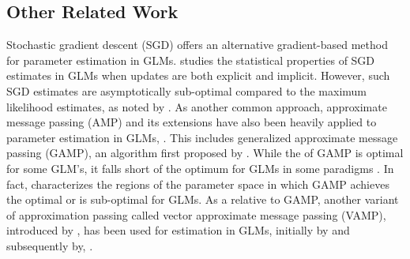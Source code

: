 \subsection{Other Related Work}
Stochastic gradient descent (SGD) \citep{robbins1951stochastic,sakrison1965efficient} offers an alternative gradient-based method for parameter estimation in GLMs.
\cite{toulis2014statistical} studies the statistical properties of SGD estimates in GLMs when updates are both explicit and implicit.
However, such SGD estimates are asymptotically sub-optimal compared to the maximum likelihood estimates, as noted by \cite{toulis2014statistical}.
As another common approach, approximate message passing (AMP) and its extensions have also been heavily applied to parameter estimation in GLMs, \eg \cite{mondelli2021approximate,venkataramanan2022estimation,zhang2024spectral,barbier2019optimal,zhu2018amp,schniter2016vector,zhao2024vector}.
This includes generalized approximate message passing (GAMP), an algorithm first proposed by \cite{rangan2011generalized}.
While the \errorrate of GAMP is \informationtheoretically optimal for some GLM's, it falls short of
the \informationtheoretical optimum for GLMs in some paradigms \citep{barbier2019optimal}.
In fact,
\cite{barbier2019optimal} characterizes the regions of the parameter space in which GAMP achieves the \informationtheoretical optimal \errorrate or is \informationtheoretically sub-optimal for GLMs.
As a relative to GAMP, another variant of approximation passing called vector approximate message passing (VAMP), introduced by \cite{rangan2019vector}, has been used for estimation in GLMs, initially by \cite{schniter2016vector} and subsequently by, \eg \cite{zhao2024vector}.


